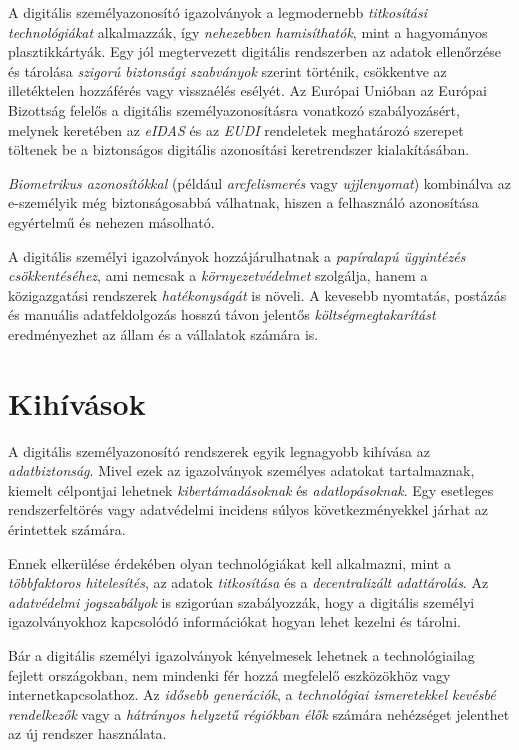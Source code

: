 \documentclass[
]{thesis-ekf}
\theoremstyle{definition}
\theoremstyle{remark}
\begin{document}
	A digitális személyazonosító igazolványok a legmodernebb \emph{titkosítási technológiákat} alkalmazzák, így \emph{nehezebben hamisíthatók}, mint a hagyományos plasztikkártyák. Egy jól megtervezett digitális rendszerben az adatok ellenőrzése és tárolása \emph{szigorú biztonsági szabványok} szerint történik, csökkentve az illetéktelen hozzáférés vagy visszaélés esélyét. Az Európai Unióban az Európai Bizottság felelős a digitális személyazonosításra vonatkozó szabályozásért, melynek keretében az \emph{eIDAS} és az \emph{EUDI} rendeletek meghatározó szerepet töltenek be a biztonságos digitális azonosítási keretrendszer kialakításában. \cite{eIDAS, EUDI}
	
	\emph{Biometrikus azonosítókkal} (például \emph{arcfelismerés} vagy \emph{ujjlenyomat}) kombinálva az e-személyik még biztonságosabbá válhatnak, hiszen a felhasználó azonosítása egyértelmű és nehezen másolható.\cite{bioMetricsFuture}
	
	A digitális személyi igazolványok hozzájárulhatnak a \emph{papíralapú ügyintézés csökkentéséhez}, ami nemcsak a \emph{környezetvédelmet} szolgálja, hanem a közigazgatási rendszerek \emph{hatékonyságát} is növeli. A kevesebb nyomtatás, postázás és manuális adatfeldolgozás hosszú távon jelentős \emph{költségmegtakarítást} eredményezhet az állam és a vállalatok számára is.
	
	\section{Kihívások}
	A digitális személyazonosító rendszerek egyik legnagyobb kihívása az \emph{adatbiztonság}. Mivel ezek az igazolványok személyes adatokat tartalmaznak, kiemelt célpontjai lehetnek \emph{kibertámadásoknak} és \emph{adatlopásoknak}. Egy esetleges rendszerfeltörés vagy adatvédelmi incidens súlyos következményekkel járhat az érintettek számára.
	
	Ennek elkerülése érdekében olyan technológiákat kell alkalmazni, mint a \emph{többfaktoros hitelesítés}, az adatok \emph{titkosítása} és a \emph{decentralizált adattárolás}. Az \emph{adatvédelmi jogszabályok} is szigorúan szabályozzák, hogy a digitális személyi igazolványokhoz kapcsolódó információkat hogyan lehet kezelni és tárolni.
	
	Bár a digitális személyi igazolványok kényelmesek lehetnek a technológiailag fejlett országokban, nem mindenki fér hozzá megfelelő eszközökhöz vagy internetkapcsolathoz. Az \emph{idősebb generációk}, a \emph{technológiai ismeretekkel kevésbé rendelkezők} vagy a \emph{hátrányos helyzetű régiókban élők} számára nehézséget jelenthet az új rendszer használata.
	
\end{document}
